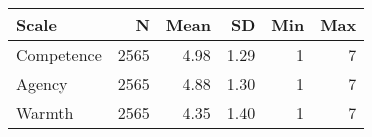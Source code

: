 \begin{table}[!h]
\centering
\caption{}
\centering
\begin{tabular}[t]{lrrrrr}
\toprule
Scale & N & Mean & SD & Min & Max\\
\midrule
Competence & 2565 & 4.98 & 1.29 & 1 & 7\\
Agency & 2565 & 4.88 & 1.30 & 1 & 7\\
Warmth & 2565 & 4.35 & 1.40 & 1 & 7\\
\bottomrule
\end{tabular}
\end{table}
